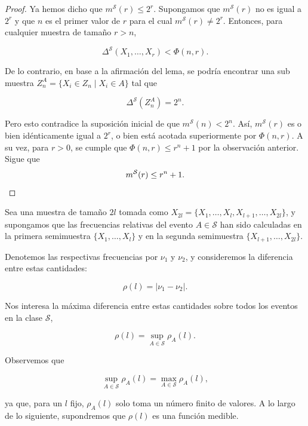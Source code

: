 \documentclass{article}
\begin{document}
\begin{proof}
Ya hemos dicho que \( m^{\mathcal{S}}(r) \leq 2^r \). Supongamos que \( m^{\mathcal{S}}(r) \) no es 
 igual a \( 2^r \) y que \( n \) es el primer valor de \( r \) para el cual \( m^{\mathcal{S}}(r) \neq 2^r \). 
    Entonces, para cualquier muestra de tamaño \( r > n \),
    
    \[
    \Delta^{\mathcal{S}}(X_1, \dots, X_r) < \Phi(n, r).
    \]
    
    De lo contrario, en base a la afirmación del lema, se podría encontrar una sub muestra  
    \( Z_n^A = \{X_i \in Z_n \mid X_i \in A\} \) tal que  
    
    \[
    \Delta^{\mathcal{S}}\left(Z_n^A\right) = 2^n.
    \]
    
  Pero esto contradice la suposición inicial de que \( m^{\mathcal{S}}(n) < 2^n \).  
    Así, \( m^{\mathcal{S}}(r) \) es o bien idénticamente igual a \( 2^r \), o bien está acotada superiormente 
    por \( \Phi(n, r) \). A su vez, para \( r > 0 \), se cumple que \( \Phi(n, r) \leq r^n + 1 \) por la observación
    anterior. Sigue que 
    \[
        m^{\mathcal{S}}(r)   \leq r^n + 1.\newline
    \]
    
\end{proof}

Sea una muestra de tamaño \( 2l \) tomada como \( X_{2l} = \{ X_1, \dots, X_l, X_{l+1}, \dots, X_{2l} \} \), 
y supongamos que las frecuencias relativas del evento \( A \in \mathcal{S} \) han sido calculadas en la primera 
semimuestra \( \{ X_1, \dots, X_l \} \) y en la segunda semimuestra \( \{ X_{l+1}, \dots, X_{2l} \} \). 

Denotemos las respectivas frecuencias por \( \nu_1 \) y \( \nu_2 \), y consideremos la diferencia entre estas cantidades:

\[
\rho(l) = |\nu_1 - \nu_2|.
\]

Nos interesa la máxima diferencia entre estas cantidades sobre todos los eventos en la clase \( \mathcal{S} \),

\[
\rho(l) = \sup_{A \in \mathcal{S}} \rho_A(l).
\]

Observemos que 

\[
\sup_{A \in \mathcal{S}} \rho_A(l) = \max_{A \in \mathcal{S}} \rho_A(l),
\]

ya que, para un \( l \) fijo, \( \rho_A(l) \) solo toma un número finito de valores. A lo largo de lo siguiente, supondremos que \( \rho(l) \) es una función medible.
\end{document}
